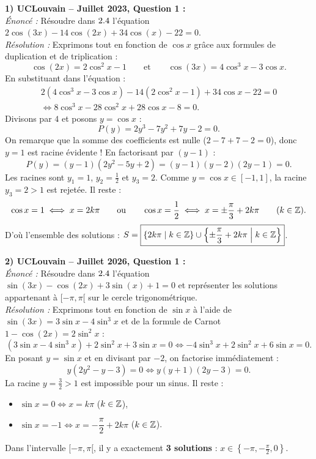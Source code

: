 \begin{exemple}
\textbf{1) UCLouvain -- Juillet 2023, Question 1 :}\\
\emph{Énoncé :} Résoudre dans $2.4$ l'équation $2\cos(3x) - 14\cos(2x) + 34\cos(x) - 22 = 0$.\\
\emph{Résolution :} Exprimons tout en fonction de $\cos x$ grâce aux formules de duplication et de triplication :
\[
    \cos(2x) = 2\cos^2 x - 1 \qquad \text{et} \qquad \cos(3x) = 4\cos^3 x - 3\cos x.
\]
En substituant dans l'équation :
\begin{align*}
    2(4\cos^3 x - 3\cos x) - 14(2\cos^2 x - 1) + 34\cos x - 22 = 0 \\
    \iff 8\cos^3 x - 28\cos^2 x + 28\cos x - 8 = 0.
\end{align*}
Divisons par $4$ et posons $y = \cos x$ :
\[
    P(y) = 2y^3 - 7y^2 + 7y - 2 = 0.
\]
On remarque que la somme des coefficients est nulle ($2 - 7 + 7 - 2 = 0$), donc $y = 1$ est racine évidente ! En factorisant par $(y-1)$ :
\[
    P(y) = (y - 1)(2y^2 - 5y + 2) = (y - 1)(y - 2)(2y - 1) = 0.
\]
Les racines sont $y_1 = 1$, $y_2 = \frac{1}{2}$ et $y_3 = 2$. Comme $y = \cos x \in [-1, 1]$, la racine $y_3 = 2 > 1$ est rejetée. Il reste :
\[
    \cos x = 1 \iff x = 2k\pi \qquad \text{ou} \qquad \cos x = \frac{1}{2} \iff x = \pm\frac{\pi}{3} + 2k\pi \qquad (k \in \mathbb{Z}).
\]
D'où l'ensemble des solutions : $S = \boxed{\{2k\pi \mid k \in \mathbb{Z}\} \cup \left\{\pm\frac{\pi}{3} + 2k\pi \;\middle|\; k \in \mathbb{Z}\right\}}$.

\medskip
\textbf{2) UCLouvain -- Juillet 2026, Question 1 :}\\
\emph{Énoncé :} Résoudre dans $2.4$ l'équation $\sin(3x) - \cos(2x) + 3\sin(x) + 1 = 0$ et représenter les solutions appartenant à $[-\pi, \pi[$ sur le cercle trigonométrique.\\
\emph{Résolution :} Exprimons tout en fonction de $\sin x$ à l'aide de $\sin(3x) = 3\sin x - 4\sin^3 x$ et de la formule de Carnot $1 - \cos(2x) = 2\sin^2 x$ :
\[
    (3\sin x - 4\sin^3 x) + 2\sin^2 x + 3\sin x = 0 \iff -4\sin^3 x + 2\sin^2 x + 6\sin x = 0.
\]
En posant $y = \sin x$ et en divisant par $-2$, on factorise immédiatement :
\[
    y(2y^2 - y - 3) = 0 \iff y(y + 1)\left(2y - 3\right) = 0.
\]
La racine $y = \frac{3}{2} > 1$ est impossible pour un sinus. Il reste :
\begin{itemize}
    \item $\sin x = 0 \iff x = k\pi$ ($k \in \mathbb{Z}$),
    \item $\sin x = -1 \iff x = -\dfrac{\pi}{2} + 2k\pi$ ($k \in \mathbb{Z}$).
\end{itemize}
Dans l'intervalle $[-\pi, \pi[$, il y a exactement \textbf{3 solutions} : $\boxed{x \in \left\{-\pi, -\frac{\pi}{2}, 0\right\}}$.


\end{exemple}
